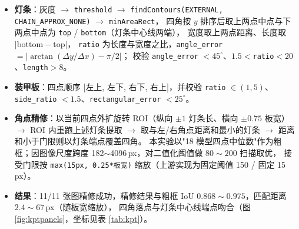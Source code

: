 \documentclass[11pt,a4paper]{ctexart}
\newcommand{\code}[1]{\texttt{\small #1}}
\begin{document}
\begin{itemize}\itemsep2pt
  \item \textbf{灯条}：灰度 $\to$ \code{threshold} $\to$ \code{findContours(EXTERNAL, CHAIN\_APPROX\_NONE)} $\to$ \code{minAreaRect}，
        四角按 $y$ 排序后取上两点中点与下两点中点为 \code{top} / \code{bottom}（灯条中心线两端），
        宽度取上两点距离、长度取 $|\mathrm{bottom}-\mathrm{top}|$，
        \code{ratio} 为长度与宽度之比，\code{angle\_error} $= |\arctan(\Delta y/\Delta x)-\pi/2|$；
        校验 \code{angle\_error} $<45^\circ$、$1.5<$\code{ratio}$<20$、\code{length}$>8$。
  \item \textbf{装甲板}：四点顺序 $[$左上, 左下, 右下, 右上$]$，并校验 \code{ratio} $\in(1,5)$、\code{side\_ratio} $<1.5$、\code{rectangular\_error} $<25^\circ$。
  \item \textbf{角点精修}：以当前四点外扩旋转 ROI（纵向 $\pm1$ 灯条长、横向 $\pm0.75$ 板宽）$\to$ ROI 内重跑上述灯条提取
        $\to$ 取与左/右角点距离和最小的灯条 $\to$ 距离和小于门限则以灯条端点覆盖四角。
        本实验以"18 模型四点中位数"作为粗框；因图像尺度跨度 182$\sim$4096\,px，对二值化阈值做 $80\sim200$ 扫描取优，
        接受门限按 \code{max(15px, 0.25*板宽)} 缩放（上游实现为固定阈值 150 / 固定 15\,px）。
  \item \textbf{结果}：11/11 张图精修成功，精修结果与粗框 IoU $0.868\sim0.975$，匹配距离 $2.4\sim67$\,px（随板宽缩放），
        四角落点与灯条中心线端点吻合（图 \ref{fig:kptpanels}，坐标见表 \ref{tab:kpt}）。
\end{itemize}
\end{document}
